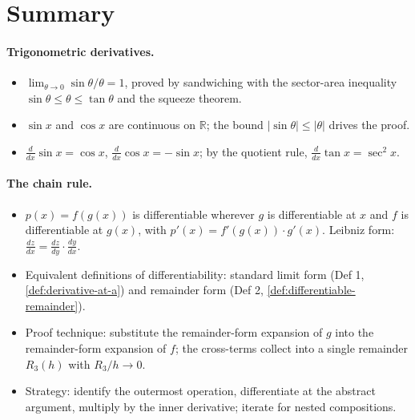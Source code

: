 \section*{Summary}

\paragraph{Trigonometric derivatives.}
\begin{itemize}
    \item \(\displaystyle \lim_{\theta \to 0} \sin \theta / \theta = 1\), proved by sandwiching with the sector-area inequality \(\sin \theta \leq \theta \leq \tan \theta\) and the squeeze theorem.
    \item \(\sin x\) and \(\cos x\) are continuous on \(\mathbb{R}\); the bound \(\lvert \sin \theta \rvert \leq \lvert \theta \rvert\) drives the proof.
    \item \(\frac{d}{dx} \sin x = \cos x\), \(\frac{d}{dx} \cos x = -\sin x\); by the quotient rule, \(\frac{d}{dx} \tan x = \sec^{2} x\).
\end{itemize}

\paragraph{The chain rule.}
\begin{itemize}
    \item \(p(x) = f(g(x))\) is differentiable wherever \(g\) is differentiable at \(x\) and \(f\) is differentiable at \(g(x)\), with \(p'(x) = f'(g(x)) \cdot g'(x)\). Leibniz form: \(\frac{dz}{dx} = \frac{dz}{dy} \cdot \frac{dy}{dx}\).
    \item Equivalent definitions of differentiability: standard limit form (Def 1, \cref{def:derivative-at-a}) and remainder form (Def 2, \cref{def:differentiable-remainder}).
    \item Proof technique: substitute the remainder-form expansion of \(g\) into the remainder-form expansion of \(f\); the cross-terms collect into a single remainder \(R_{3}(h)\) with \(R_{3}/h \to 0\).
    \item Strategy: identify the outermost operation, differentiate at the abstract argument, multiply by the inner derivative; iterate for nested compositions.
\end{itemize}

